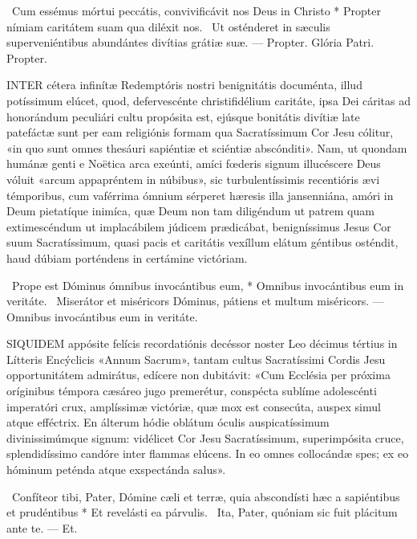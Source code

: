 \R\ Cum essémus mórtui peccátis, convivificávit nos Deus in Christo * Propter nímiam caritátem suam qua diléxit nos. \V\ Ut osténderet in sæculis superveniéntibus abundántes divítias grátiæ suæ. --- Propter. Glória Patri. Propter.





\lettrine[lines=2]{I}{NTER} cétera infinítæ Redemptóris nostri benignitátis documénta, illud potíssimum elúcet, quod, defervescénte christifidélium caritáte, ipsa Dei cáritas ad honorándum peculiári cultu propósita est, ejúsque bonitátis divítiæ late patefáctæ sunt per eam religiónis formam qua Sacratíssimum Cor Jesu cólitur, «in quo sunt omnes thesáuri sapiéntiæ et sciéntiæ abscónditi». Nam, ut quondam humánæ genti e Noëtica arca exeúnti, amíci fœderis signum illucéscere Deus vóluit «arcum appapréntem in núbibus», sic turbulentíssimis recentióris ævi témporibus, cum vaférrima ómnium sérperet hæresis illa jansenniána, amóri in Deum pietatíque inimíca, quæ Deum non tam diligéndum ut patrem quam extimescéndum ut implacábilem júdicem prædicábat, benigníssimus Jesus Cor suum Sacratíssimum, quasi pacis et caritátis vexíllum elátum géntibus osténdit, haud dúbiam porténdens in certámine victóriam.

\R\ Prope est Dóminus ómnibus invocántibus eum, * Omnibus invocántibus eum in veritáte. \V\ Miserátor et miséricors Dóminus, pátiens et multum miséricors. --- Omnibus invocántibus eum in veritáte.


\lettrine[lines=2]{S}{IQUIDEM} appósite felícis recordatiónis decéssor noster Leo décimus tértius in Lítteris Encýclicis «Annum Sacrum», tantam cultus Sacratíssimi Cordis Jesu opportunitátem admirátus, edícere non dubitávit: «Cum Ecclésia per próxima oríginibus témpora cæsáreo jugo premerétur, conspécta sublíme adolescénti imperatóri crux, amplíssimæ victóriæ, quæ mox est consecúta, auspex simul atque efféctrix. En álterum hódie oblátum óculis auspicatíssimum divinissimúmque signum: vidélicet Cor Jesu Sacratíssimum, superimpósita cruce, splendidíssimo candóre inter flammas elúcens. In eo omnes collocándæ spes; ex eo hóminum peténda atque exspectánda salus».

\R\ Confíteor tibi, Pater, Dómine cæli et terræ, quia abscondísti hæc a sapiéntibus et prudéntibus * Et revelásti ea párvulis. \V\ Ita, Pater, quóniam sic fuit plácitum ante te. --- Et.

